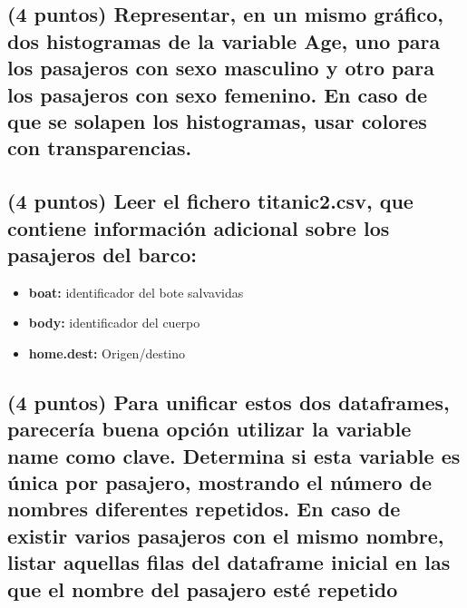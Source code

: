\documentclass[]{article}
\providecommand{\tightlist}{%
  \setlength{\itemsep}{0pt}\setlength{\parskip}{0pt}}
\begin{document}
\subsection{\texorpdfstring{(4 puntos) Representar, en un mismo gráfico,
dos histogramas de la variable \textbf{Age}, uno para los pasajeros con
sexo masculino y otro para los pasajeros con sexo femenino. En caso de
que se solapen los histogramas, usar colores con
transparencias.}{(4 puntos) Representar, en un mismo gráfico, dos histogramas de la variable Age, uno para los pasajeros con sexo masculino y otro para los pasajeros con sexo femenino. En caso de que se solapen los histogramas, usar colores con transparencias.}}\label{puntos-representar-en-un-mismo-grafico-dos-histogramas-de-la-variable-age-uno-para-los-pasajeros-con-sexo-masculino-y-otro-para-los-pasajeros-con-sexo-femenino.-en-caso-de-que-se-solapen-los-histogramas-usar-colores-con-transparencias.}

\subsection{\texorpdfstring{(4 puntos) Leer el fichero
\textbf{titanic2.csv}, que contiene información adicional sobre los
pasajeros del
barco:}{(4 puntos) Leer el fichero titanic2.csv, que contiene información adicional sobre los pasajeros del barco:}}\label{puntos-leer-el-fichero-titanic2.csv-que-contiene-informacion-adicional-sobre-los-pasajeros-del-barco}

\begin{itemize}
\tightlist
\item
  \textbf{boat:} identificador del bote salvavidas
\item
  \textbf{body:} identificador del cuerpo
\item
  \textbf{home.dest:} Origen/destino
\end{itemize}

\subsection{(4 puntos) Para unificar estos dos dataframes, parecería
buena opción utilizar la variable name como clave. Determina si esta
variable es única por pasajero, mostrando el número de nombres
diferentes repetidos. En caso de existir varios pasajeros con el mismo
nombre, listar aquellas filas del dataframe inicial en las que el nombre
del pasajero esté
repetido}\label{puntos-para-unificar-estos-dos-dataframes-pareceria-buena-opcion-utilizar-la-variable-name-como-clave.-determina-si-esta-variable-es-unica-por-pasajero-mostrando-el-numero-de-nombres-diferentes-repetidos.-en-caso-de-existir-varios-pasajeros-con-el-mismo-nombre-listar-aquellas-filas-del-dataframe-inicial-en-las-que-el-nombre-del-pasajero-este-repetido}
\end{document}
